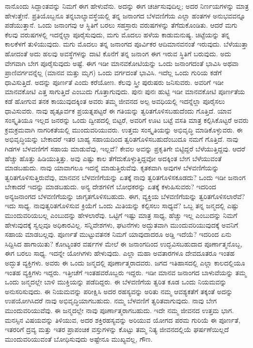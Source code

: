 ನಾನೊಂದು ಸಿದ್ದಾಂತವನ್ನು ನಿಮಗೆ ಈಗ ಹೇಳುವೆನು. ಅದನ್ನು ಈಗ ಚರ್ಚಿಸುವುದಿಲ್ಲ; ಅದರ ನಿರ್ಣಯಗಳನ್ನು ಮಾತ್ರ ಹೇಳುತ್ತೇನೆ. ಪ್ರತಿಯೊಬ್ಬನೂ ತನ್ನ\break ಬಾಲ್ಯಾವಸ್ಥೆಯಲ್ಲಿ ತನ್ನ ಜನಾಂಗದ ಬೆಳವಣಿಗೆಯ ಎಲ್ಲಾ ಹಂತಗಳ ಅನುಭವವನ್ನೂ ಪಡೆಯುತ್ತಾನೆ. ಒಂದು ಜನಾಂಗವು ಆ ಸ್ಥಿತಿಗೆ ಬರಲು ಸಹಸ್ರಾರು ವರುಷಗಳನ್ನು ತೆಗೆದುಕೊಂಡಿತು. ಆದರೆ ಮಗು ಕೆಲವು ವರುಷಗಳಲ್ಲಿ ಇದನ್ನೆಲ್ಲಾ ಪೂರೈಸುವುದು, ಮಗು ಮೊದಲು ಹಳೆಯ ಕಾಡುಮನುಷ್ಯ. ಚಿಟ್ಟೆಯನ್ನು ತನ್ನ ಕಾಲಕೆಳಗೆ ತುಳಿಯುವುದು. ಮಗು ಮೊದಲು ತನ್ನ ಜನಾಂಗದ ಪೂರ್ವಿಕರ ಆದಿಮಾನವನಂತೆ ಇರುವುದು. ಬೆಳೆಯುತ್ತಾ ಹೋದಂತೆ ಅದು ಹಲವು ಅವಸ್ಥೆಗಳನ್ನು ದಾಟಿ ಕೊನೆಗೆ ತನ್ನ ಜನಾಂಗ ಈಗ ಇರುವ ಸ್ಥಿತಿಗೆ ಬರುವುದು. ಅದು ವೇಗವಾಗಿ ಬೇಗ ಪೂರೈಸುವುದು ಅಷ್ಟೆ. ಈಗ ಇಡೀ ಮಾನವಕೋಟಿಯನ್ನು ಒಂದು ಜನಾಂಗದಂತೆ ಭಾವಿಸಿ ಅಥವಾ ಪ್ರಾಣಿವರ್ಗವನ್ನೆಲ್ಲ (ಮಾನವ ಮತ್ತು ಮೃಗ) ಒಂದು ವರ್ಗದಂತೆ ಭಾವಿಸಿ. ಇದೆಲ್ಲ ಒಂದು ಗುರಿಯ ಕಡೆಗೆ ಧಾವಿಸುತ್ತಿದೆ. ಅದನ್ನು ಪೂರ್ಣತೆ ಎಂದು ಕರೆಯೋಣ. ಕೆಲವು ಸ್ತ್ರೀ ಪುರುಷರು ಜನಿಸುವರು. ಅವರಿಗೆ ಇಡೀ ಮಾನವಕೋಟಿ ಎತ್ತ ಸಾಗುತ್ತಿದೆ ಎಂಬುದು ಗೊತ್ತಾಗುವುದು. ಪುನಃ ಪುನಃ ಹುಟ್ಟಿ ಇಡೀ ಮಾನವಕೋಟಿ ಪೂರ್ಣತೆಯ ಕಡೆ ಹೋಗುವ ತನಕ ಕಾಯುವುದಕ್ಕಿಂತ ಅವರು ತಮ್ಮ ಜೀವನದ ಅಲ್ಪ ಅವಧಿಯಲ್ಲಿ ಇದನ್ನೆಲ್ಲಾ ಪೂರೈಸಲು ಧಾವಿಸುವರು. ನಾವು ಹೃತ್ಪೂರ್ವಕ ಪ್ರಯತ್ನಪಟ್ಟರೆ ಈ ಗತಿಯನ್ನು ತ್ವರಿತಗೊಳಿಸಬಹುದೆಂದು ಗೊತ್ತಿದೆ. ಯಾವ ಸಂಸ್ಕೃತಿಯೂ ಇಲ್ಲದ ಜನರನ್ನು ಒಂದು ದ್ವೀಪದಲ್ಲಿ ಬಿಟ್ಟರೆ, ಅವರಿಗೆ ಊಟ ಬಟ್ಟೆ ವಸತಿ ಮಾತ್ರ ಕಲ್ಪಿಸಿಕೊಟ್ಟರೆ ಅವರು ಕ್ರಮಕ್ರಮವಾಗಿ ನಾಗರಿಕತೆಯಲ್ಲಿ ಮುಂದುವರಿಯುವರು. ಉತ್ತಮ ಸಂಸ್ಕೃತಿಯನ್ನು ಅಭಿವೃದ್ಧಿ ಮಾಡಿಕೊಳ್ಳುವರು. ಈ ಅಭಿವೃದ್ಧಿಯನ್ನು ಬೇಕಾದರೆ ಇತರ ಬಾಹ್ಯ ಸಹಾಯದಿಂದ ತ್ವರಿತಗೊಳಿಸಬಹುದೆಂಬುದೂ ನಮಗೆ ಗೊತ್ತಿದೆ. ನಾವು ಗಿಡಗಳ ಬೆಳವಣಿಗೆಗೆ ಸಹಾಯ ಮಾಡುವೆವು, ಇಲ್ಲವೆ? ಕೇವಲ ಅವನ್ನು ಪ್ರಕೃತಿಗೇ ಬಿಟ್ಟಿದ್ದರೆ ಬೆಳೆಯುತ್ತಿದ್ದವು. ಆದರೆ ಹೆಚ್ಚು ಹೊತ್ತು ಹಿಡಿಯುತ್ತಿತ್ತು. ಅವು ಎಷ್ಟು ಕಾಲ ತೆಗೆದುಕೊಳ್ಳುತ್ತಿದ್ದವೋ ಅದಕ್ಕಿಂತ ಬೇಗ ಬೆಳೆಯುವಂತೆ ಮಾಡಬಹುದು. ನಾವು ಯಾವಾಗಲೂ ಇದನ್ನೆ ಮಾಡುತ್ತಿರುವೆವು. ಕೃತಕವಾಗಿ ಅವುಗಳ ಬೆಳವಣಿಗೆಯನ್ನು ತ್ವರಿತಗೊಳಿಸುತ್ತಿರುವೆವು, ಮಾನವನ ಬೆಳವಣಿಗೆಯನ್ನು ಏತಕ್ಕೆ ನಾವು ತ್ವರಿತಗೊಳಿಸಕೂಡದು? ಒಂದು ಇಡೀ ಜನಾಂಗ ಬೇಕಾದರೆ ಇದನ್ನು ಮಾಡಬಹುದು. ಅನ್ಯ ದೇಶಗಳಿಗೆ ಬೋಧಕರನ್ನು ಏತಕ್ಕೆ ಕಳುಹಿಸುವರು? ಇದರಿಂದ ಅನ್ಯಜನಾಂಗದ ಬೆಳವಣಿಗೆಯನ್ನು ಜಾಗೃತಗೊಳಿಸಬಹುದು. ಈಗ, ವ್ಯಕ್ತಿಯ ಬೆಳವಣಿಗೆಯನ್ನು ತ್ವರಿತಗೊಳಿಸಲಾರೆವೆ? ಇದು ಸಾಧ್ಯ. ನಾವು\break ತ್ವರಿತಗೊಳಿಸುವ ಕ್ರಿಯೆಗೆ ಒಂದು ಮಿತಿಯನ್ನು ಕಲ್ಪಿಸಲು ಸಾಧ್ಯವೆ? ಒಬ್ಬ ತನ್ನ ಜನ್ಮದಲ್ಲಿ ಎಷ್ಟು ಮುಂದುವರಿಯಬಲ್ಲ ಎಂಬುದನ್ನು ಹೇಳಲಾರೆವು. ಒಟ್ಟಿಗೆ ಇಷ್ಟು ಮಾತ್ರ ಸಾಧ್ಯ, ಹೆಚ್ಚು ಇಲ್ಲ ಎಂಬುದನ್ನು ನಿಮಗೆ ಹೇಳುವುದಕ್ಕೆ ಸ್ವಲ್ಪವೂ ಅಧಿಕಾರವಿಲ್ಲ. ಸನ್ನಿವೇಶಗಳು, ಘಟನೆಗಳು ಅದ್ಭುತವಾಗಿ ಮುಂದುವರಿಯುವುದಕ್ಕೆ ಅವನಿಗೆ ಸಹಾಯ ಮಾಡಬಲ್ಲವು. ಪೂರ್ಣತೆ ಮುಟ್ಟುವತನಕ ನಿಮಗೆ ಯಾವುದಾದರೂ ಅಡ್ಡಿ ಇದೆಯೆ? ಇದರಿಂದ ಏನು ಸಿದ್ದಿಸಿದ ಹಾಗಾಯಿತು? ಕೋಟ್ಯಂತರ ವರ್ಷಗಳ ಮೇಲೆ ಈ ಜನಾಂಗದಿಂದ ಉದ್ಭವಿಸಬಹುದಾದ ಪೂರ್ಣಾತ್ಮನೊಬ್ಬ, ಈಗ ಬರಲು ಸಾಧ್ಯ. ಇದನ್ನೇ ಯೋಗಿಗಳು ಹೇಳುವುದು. ಎಲ್ಲಾ ಮಹಾ ಅವತಾರಗಳೂ ದೇವದೂತರೂ ಇಂತಹ ಅದ್ಭುತ ವ್ಯಕ್ತಿಗಳು. ಅವರು ಈ ಒಂದು ಜನ್ಮದಲ್ಲಿ ಪೂರ್ಣಾತ್ಮರಾದವರು. ಜಗದ ಇತಿಹಾಸದಲ್ಲಿ ಎಲ್ಲಾ ಕಾಲದಲ್ಲಿಯೂ ಇಂತಹ ವ್ಯಕ್ತಿಗಳು ಇದ್ದರು. ಇತ್ತೀಚೆಗೆ ಇಂತಹವರೊಬ್ಬರು ಇದ್ದರು. ಇಡೀ ಮಾನವ ಜನಾಂಗದ ಬಾಳುವೆಯನ್ನು ತಮ್ಮ ಒಂದು ಜನ್ಮದಲ್ಲೇ ಬಾಳಿ ಮುಕ್ತಿಯನ್ನು ಪಡೆದಿದ್ದರು. ಈ ಬೆಳವಣಿಗೆಯ ತ್ವರಿತ ಕೂಡ ಒಂದು ನಿಯಮವನ್ನು ಅನುಸರಿಸುವುದು. ಈ ನಿಯಮವನ್ನು ಪರೀಕ್ಷಿಸಿ ಅದರ ರಹಸ್ಯವನ್ನು ಅರಿತು ನಮ್ಮ ಆವಶ್ಯಕತೆಗೆ ತಕ್ಕಂತೆ ಅದನ್ನು ಉಪಯೋಗಿಸಿದರೆ ನಾವು ಅಭಿವೃದ್ಧಿಯಾಗಬಹುದು. ನಮ್ಮ ಬೆಳವಣಿಗೆ ತ್ವರಿತವಾಗುವುದು. ನಾವು ಬೇಗ ಮುಂದುವರಿಯುವೆವು. ಈ ಜನ್ಮದಲ್ಲೇ ನಾವು ಪೂರ್ಣಾತ್ಮರಾಗಬಹುದು. ಇದೇ ನಮ್ಮ ಜೀವನದ ಉತ್ತಮ ಭಾಗ. ಮನಸ್ಸಿನ ವಿಷಯವನ್ನು ತಿಳಿಯುವ, ಅದರ ಶಕ್ತಿರಹಸ್ಯವನ್ನು ಅರಿಯುವ ಯೋಗದ ಪರಮ ಗುರಿಯೆ ಈ ಪೂರ್ಣತೆ, ಇತರರಿಗೆ ದ್ರವ್ಯ ಮತ್ತು ಇತರ ಪ್ರಾಪಂಚಿಕ ವಸ್ತುಗಳನ್ನು ಕೊಟ್ಟು ತಮ್ಮ ನಿತ್ಯ ಜೀವನದಲ್ಲಿಯೆ ಘರ್ಷಣೆಯಿಲ್ಲದೆ ಮುಂದುವರಿಯುವಂತೆ ಬೋಧಿಸುವುದು ಅಷ್ಟೇನೂ ಮುಖ್ಯವಲ್ಲ, ಗೌಣ.

